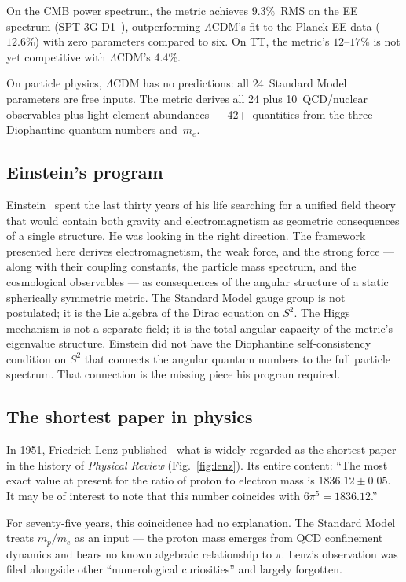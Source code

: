 \documentclass[aps,prd,twocolumn,superscriptaddress,nofootinbib,longbibliography]{revtex4-2}
\begin{document}
On the CMB power spectrum, the metric achieves $9.3\%$~RMS on the EE
spectrum (SPT-3G D1~\cite{SPT3GD1}), outperforming $\Lambda$CDM's
fit to the Planck EE data ($12.6\%$) with zero parameters compared
to six.  On TT, the metric's $12$--$17\%$ is not yet competitive
with $\Lambda$CDM's $4.4\%$.

On particle physics, $\Lambda$CDM has no predictions: all 24~Standard
Model parameters are free inputs.  The metric derives all 24 plus
10~QCD/nuclear observables plus light element abundances ---
42+~quantities from the three Diophantine quantum numbers
and~$m_e$.

\subsection{Einstein's program}

Einstein~\cite{Einstein1916} spent the last thirty years of his life
searching for a unified field theory that would contain both gravity
and electromagnetism as geometric consequences of a single structure.  He
was looking in the right direction.  The framework presented here
derives electromagnetism, the weak force, and the strong force ---
along with their coupling constants, the particle mass spectrum, and
the cosmological observables --- as consequences of the angular
structure of a static spherically symmetric metric.  The Standard
Model gauge group is not postulated; it is the Lie algebra of the
Dirac equation on $S^2$.  The Higgs mechanism is not a separate
field; it is the total angular capacity of the metric's eigenvalue
structure.  Einstein did not have the Diophantine self-consistency
condition on $S^2$ that connects the angular quantum numbers to the
full particle spectrum.  That connection is the missing piece his
program required.

\subsection{The shortest paper in physics}

In 1951, Friedrich Lenz published~\cite{Lenz1951} what is widely regarded as the
shortest paper in the history of \textit{Physical Review}
(Fig.~\ref{fig:lenz}).  Its entire content: ``The most exact value at
present for the ratio of proton to electron mass is
$1836.12 \pm 0.05$.  It may be of interest to note that this number
coincides with $6\pi^5 = 1836.12$.''

For seventy-five years, this coincidence had no explanation.  The
Standard Model treats $m_p/m_e$ as an input --- the proton mass
emerges from QCD confinement dynamics and bears no known algebraic
relationship to $\pi$.  Lenz's observation was filed alongside other
``numerological curiosities'' and largely forgotten.
\end{document}
